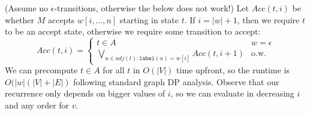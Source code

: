 \documentclass[fleqn]{article}
\begin{document}
\begin{enumerate}
    \begin{answer}
        (Assume no $\epsilon$-transitions, otherwise the below does not work!)
        Let $Acc(t,i)$ be whether $M$ accepts $w[i,\dots,n]$ starting in state $t$. If $i = |w| + 1$, then we require $t$ to be an accept state, otherwise we require some transition to accept:
        \[
            Acc(t,i) = \begin{cases}
                t \in A & w = \epsilon \\
                \bigvee\limits_{u \in adj(t) : \texttt{label}(u) = w[i]} Acc(t, i+1) & \text{o.w.}
            \end{cases}
        \]
        We can precompute $t \in A$ for all $t$ in $O(|V|)$ time upfront, so the runtime is $O(|w|(|V| + |E|)$ following standard graph DP analysis. Observe that our recurrence only depends on bigger values of $i$, so we can evaluate in decreasing $i$ and any order for $v$.
    \end{answer}
\end{enumerate}
\end{document}
